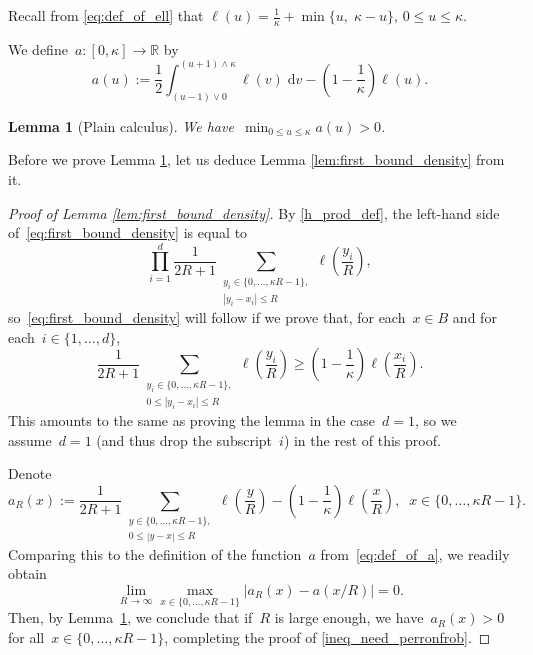 \documentclass[a4paper,12pt]{article}
\newtheorem  {lemma}         [theorem]{Lemma}
\begin{document}
Recall from \eqref{eq:def_of_ell} that $\ell(u)=
\frac{1}{\kappa} + \min\{u,\;\kappa -u \}, \, 0 \leq u \leq \kappa$.

 We define~$a: [0,\kappa] \to \mathbb{R}$ by
\begin{equation}
\label{eq:def_of_a}
a(u) :=
 \frac12 \int_{(u-1)\vee 0}^{(u+1)\wedge \kappa} \ell(v)\;\textrm{d}v - \left(1 - \frac{1}{\kappa}\right) \ell(u).
\end{equation}

\begin{lemma}[Plain calculus] \label{lem:calculus}
We have~$\min_{0 \leq u \leq \kappa } a(u) > 0$.
\end{lemma}
Before we prove Lemma \ref{lem:calculus}, let us deduce Lemma \ref{lem:first_bound_density} from it.

\begin{proof}[Proof of Lemma \ref{lem:first_bound_density}]
By \eqref{h_prod_def}, the left-hand side of~\eqref{eq:first_bound_density} is equal to
$$\prod_{i=1}^d \frac{1}{2R+1}  \sum_{\substack{y_i \in \{0,\ldots, \kappa R-1\},\\  |y_i - x_i| \leq R}} \ell \left( \frac{y_i}{R} \right), $$
so~\eqref{eq:first_bound_density} will follow if we prove that, for each~$x \in B$ and for each~$i \in \{1,\ldots, d\}$,
\begin{equation}\label{ineq_need_perronfrob}
 \frac{1}{2R+1}  \sum_{\substack{y_i \in \{0,\ldots, \kappa R-1\},\\ 0 \leq |y_i - x_i| \leq R}} \ell \left( \frac{y_i}{R} \right) \geq \left(1- \frac{1}{\kappa}\right) \ell \left(\frac{x_i}{R}\right).
 \end{equation}
This amounts to the same as proving the lemma in the case~$d= 1$, so we assume~$d = 1$ (and thus drop the subscript~$i$) in the rest of this proof.

Denote
$$ a_R(x) :=  \frac{1}{2R+1} \sum_{\substack{ y \in \{0,\ldots, \kappa R-1\},\\ 0 \leq |y - x| \leq R }} \ell \left(\frac{y}{R}\right) -  \left(1-\frac{1}{\kappa}\right)\ell\left( \frac{x}{R}\right),\;\; x \in \{0,\ldots, \kappa R - 1\}. $$
Comparing this to the definition of the function~$a$ from~\eqref{eq:def_of_a}, we readily obtain
$$ \lim_{R \to \infty} \max_{x \in \{0,\ldots, \kappa R-1\}} |a_R(x) - a(x/R)| = 0.$$
Then, by Lemma~\ref{lem:calculus}, we conclude that if~$R$ is large enough, we have~$a_R(x) > 0$ for all~$x \in \{0,\ldots,\kappa R - 1\}$, completing the proof of
\eqref{ineq_need_perronfrob}.
 \end{proof}
\end{document}
